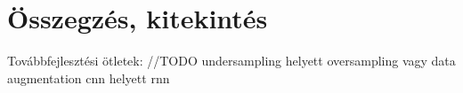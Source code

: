 \chapter{Összegzés, kitekintés} %
\label{ch:sum}

Továbbfejlesztési ötletek:
//TODO undersampling helyett oversampling vagy data augmentation
cnn helyett rnn